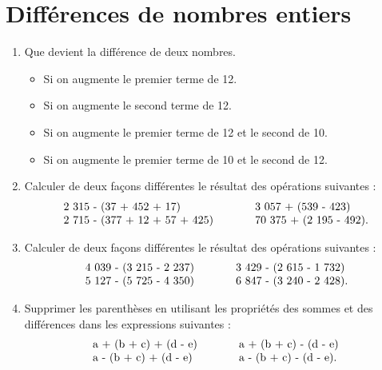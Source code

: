 \documentclass[12 pt]{report}
\theoremstyle{plain}
\newcounter{n}
\begin{document}
 \chapter{Différences de nombres entiers}
 \begin{enumerate}
 \item Que devient la différence de deux nombres.\begin{itemize}
 \item Si on augmente le premier terme de 12.
 \item Si on augmente le second terme de 12. 
 \item Si on augmente le premier terme de 12 et le second de 10. 
 \item Si on augmente le premier terme de 10 et le second de 12.
 \end{itemize}
 
 \item Calculer de deux façons différentes le résultat des opérations suivantes : 
 \[
 \begin{tabular}{l c l }
 2~315 - (37 + 452 + 17) & \ \ \ \ \ & 3~057 + (539 - 423) \\
 2~715 - (377 + 12 + 57 + 425) & \ \ \ \ \ & 70~375 + (2~195 - 492).
  \end{tabular}
 \]
 
  \item Calculer de deux façons différentes le résultat des opérations suivantes : 
 \[
 \begin{tabular}{l c l }
 4~039 - (3~215 - 2~237) & \ \ \ \ \ & 3~429 - (2~615 - 1~732) \\
 5~127 - (5~725 - 4~350) & \ \ \ \ \ & 6~847 - (3~240 - 2~428).
  \end{tabular}
 \]
 
 \item Supprimer les parenthèses en utilisant les propriétés des sommes et
 des différences dans les expressions suivantes : 
  \[
 \begin{tabular}{l c l }
 a + (b + c) + (d - e) & \ \ \ \ \ & a + (b + c) - (d - e) \\
 a - (b + c) + (d - e) & \ \ \ \ \ & a - (b + c) - (d - e).
  \end{tabular}
 \]
 

\end{enumerate}
\end{document}
